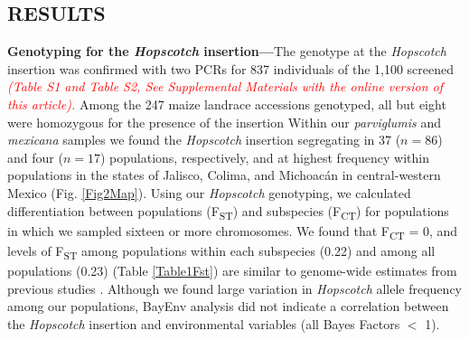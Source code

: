 \documentclass[11pt]{article} %
\newcommand{\track}[1]{\textcolor{red}{\emph{\normalsize #1}} }
\begin{document}
\begin{linenumbers}
\begin{flushleft}
\begin{centering}
\section*{RESULTS}
\end{centering}

\textbf{Genotyping for the \emph{Hopscotch} insertion---}The genotype at the \emph{Hopscotch} insertion was confirmed with two PCRs for 837 individuals of the 1,100 screened \track{(Table S1 and Table S2, See Supplemental Materials with the online version of this article).}Among the 247 maize landrace accessions genotyped, all but eight were homozygous for the presence of the insertion Within our \emph{parviglumis} and \emph{mexicana} samples we found the \emph{Hopscotch} insertion segregating in 37 ($n=86$) and four ($n=17$) populations, respectively, and at highest frequency within populations in the states of Jalisco, Colima, and Michoac\'{a}n in central-western Mexico (Fig. \ref{Fig2Map}). Using our \emph{Hopscotch} genotyping, we calculated differentiation between populations (F\textsubscript{ST}) and subspecies (F\textsubscript{CT}) for populations in which we sampled sixteen or more chromosomes. We found that F\textsubscript{CT} = 0, and levels of F\textsubscript{ST} among populations within each subspecies (0.22) and among all populations (0.23) (Table \ref{Table1Fst}) are similar to genome-wide estimates from previous studies \citealt{Pyhajarvi2013}. Although we found large variation in \emph{Hopscotch} allele frequency among our populations, BayEnv analysis did not indicate a correlation between the \emph{Hopscotch} insertion and environmental variables (all Bayes Factors $<$ 1). 


\end{flushleft}
\end{linenumbers}
\end{document}
